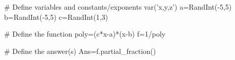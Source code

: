 
\begin{sagesilent}
# Define variables and constants/exponents
var('x,y,z')
a=RandInt(-5,5)
b=RandInt(-5,5)
c=RandInt(1,3)

# Define the function
poly=(c*x-a)*(x-b)
f=1/poly

# Define the answer(s)
Ans=f.partial_fraction()

\end{sagesilent}
 

































